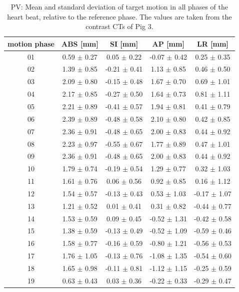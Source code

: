 \documentclass[type=dr, dr=rernat, accentcolor=tud7b,colorbacktitle, bigchapter, openright, twoside, 12pt ]{tudthesis}
\begin{document}
\begin{table}[htbp]
  \centering
    \tiny
  \caption{PV: Mean and standard deviation of target motion in all phases of the heart beat, relative to the reference phase. The values are 
  taken from the contrast CTs of Pig 3.}
  \begin{tabular}{|c|c|c|c|c|}
    \hline\hline
    motion phase\rule{0pt}{2.6ex}\rule[-1.2ex]{0pt}{0pt} & ABS [mm] & SI [mm] & AP [mm] & LR [mm]\\
    \hline
01 &0.59 $\pm$ 0.27 &0.05 $\pm$ 0.22 &-0.07 $\pm$ 0.42 &0.25 $\pm$ 0.35 \\
02 &1.39 $\pm$ 0.85 &-0.21 $\pm$ 0.41 &1.13 $\pm$ 0.85 &0.46 $\pm$ 0.50 \\
03 &2.09 $\pm$ 0.80 &-0.15 $\pm$ 0.48 &1.67 $\pm$ 0.70 &0.69 $\pm$ 1.01 \\
04 &2.17 $\pm$ 0.85 &-0.27 $\pm$ 0.50 &1.64 $\pm$ 0.73 &0.81 $\pm$ 1.11 \\
05 &2.21 $\pm$ 0.89 &-0.41 $\pm$ 0.57 &1.94 $\pm$ 0.81 &0.41 $\pm$ 0.79 \\
06 &2.39 $\pm$ 0.89 &-0.48 $\pm$ 0.58 &2.10 $\pm$ 0.80 &0.42 $\pm$ 0.85 \\
07 &2.36 $\pm$ 0.91 &-0.48 $\pm$ 0.65 &2.00 $\pm$ 0.83 &0.44 $\pm$ 0.92 \\
08 &2.23 $\pm$ 0.97 &-0.55 $\pm$ 0.67 &1.77 $\pm$ 0.89 &0.47 $\pm$ 1.01 \\
09 &2.36 $\pm$ 0.91 &-0.48 $\pm$ 0.65 &2.00 $\pm$ 0.83 &0.44 $\pm$ 0.92 \\
10 &1.79 $\pm$ 0.74 &-0.19 $\pm$ 0.54 &1.29 $\pm$ 0.77 &0.32 $\pm$ 1.03 \\
11 &1.61 $\pm$ 0.76 &0.06 $\pm$ 0.56 &0.92 $\pm$ 0.85 &0.16 $\pm$ 1.12 \\
12 &1.54 $\pm$ 0.57 &-0.13 $\pm$ 0.43 &0.53 $\pm$ 1.03 &-0.17 $\pm$ 1.07 \\
13 &1.21 $\pm$ 0.52 &0.01 $\pm$ 0.41 &0.31 $\pm$ 0.82 &-0.44 $\pm$ 0.77 \\
14 &1.53 $\pm$ 0.59 &0.09 $\pm$ 0.45 &-0.52 $\pm$ 1.31 &-0.42 $\pm$ 0.58 \\
15 &1.38 $\pm$ 0.59 &-0.13 $\pm$ 0.49 &-0.52 $\pm$ 1.09 &-0.59 $\pm$ 0.46 \\
16 &1.58 $\pm$ 0.77 &-0.16 $\pm$ 0.59 &-0.80 $\pm$ 1.21 &-0.56 $\pm$ 0.53 \\
17 &1.76 $\pm$ 1.05 &-0.13 $\pm$ 0.76 &-1.08 $\pm$ 1.35 &-0.54 $\pm$ 0.60 \\
18 &1.65 $\pm$ 0.98 &-0.11 $\pm$ 0.81 &-1.12 $\pm$ 1.15 &-0.25 $\pm$ 0.59 \\
19 &0.63 $\pm$ 0.43 &0.03 $\pm$ 0.36 &-0.22 $\pm$ 0.33 &-0.29 $\pm$ 0.47 \\
    \hline\hline
  \end{tabular}
  \label{tab:motion:PV:Pig3}
\end{table}
\end{document}
